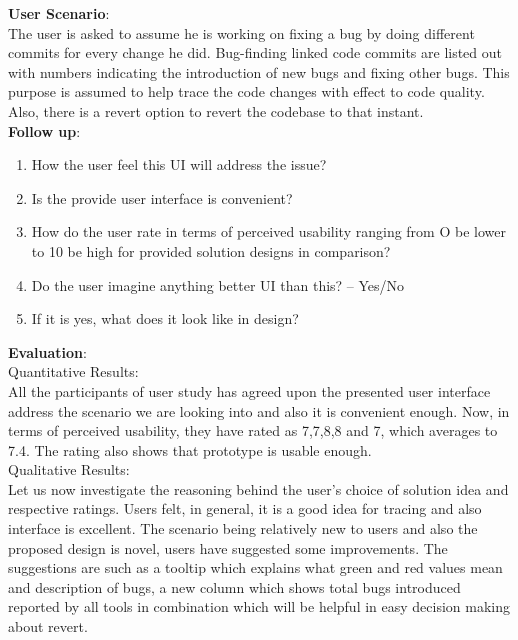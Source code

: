 \textbf{User Scenario}: \\

The user is asked to assume he is working on fixing a bug by doing different commits for every change he did. Bug-finding linked code commits are listed out with numbers indicating the introduction of new bugs and fixing other bugs. This purpose is assumed to help trace the code changes with effect to code quality. Also, there is a revert option to revert the codebase to that instant. \\

\textbf{Follow up}: \\

\begin{enumerate}
\item How the user feel this UI will address the issue?  
\item Is the provide user interface is convenient?
\item How do the user rate in terms of perceived usability ranging from O be lower to 10 be high for provided solution designs in comparison?
\item Do the user imagine anything better UI than this? – Yes/No
\item If it is yes, what does it look like in design?
\end{enumerate}

\textbf{Evaluation}: \\

Quantitative Results: \\

All the participants of user study has agreed upon the presented user interface address the scenario we are looking into and also it is convenient enough. Now, in terms of perceived usability, they have rated as 7,7,8,8 and 7, which averages to 7.4. The rating also shows that prototype is usable enough. \\


Qualitative Results: \\

Let us now investigate the reasoning behind the user’s choice of solution idea and respective ratings. Users felt, in general, it is a good idea for tracing and also interface is excellent. The scenario being relatively new to users and also the proposed design is novel, users have suggested some improvements.  The suggestions are such as a tooltip which explains what green and red values mean and description of bugs, a new column which shows total bugs introduced reported by all tools in combination which will be helpful in easy decision making about revert. \\

